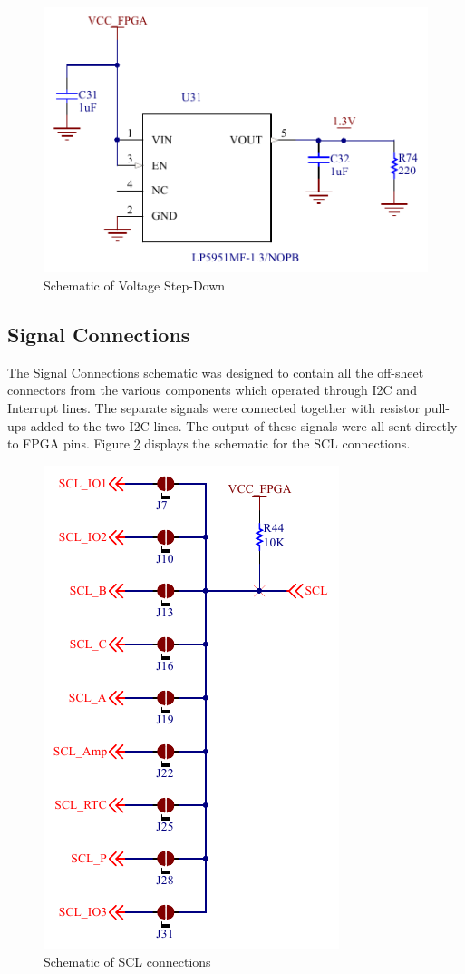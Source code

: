 \begin{figure}
	\includegraphics[width=0.5\linewidth]{Figures/voltage_stepdown.pdf}\centering
	\caption{Schematic of Voltage Step-Down}
	\label{fig:stepdown}
\end{figure}

\subsection{Signal Connections}

	The Signal Connections schematic was designed to contain all the off-sheet connectors from the various components which operated through I2C and Interrupt lines. 
The separate signals were connected together with resistor pull-ups added to the two I2C lines. 
The output of these signals were all sent directly to FPGA pins. 
Figure \ref{fig:SCL} displays the schematic for the SCL connections. 

\begin{figure}
	\includegraphics[width=0.5\linewidth]{Figures/SCL_lines.pdf}\centering
	\caption{Schematic of SCL connections}
	\label{fig:SCL}
\end{figure}


